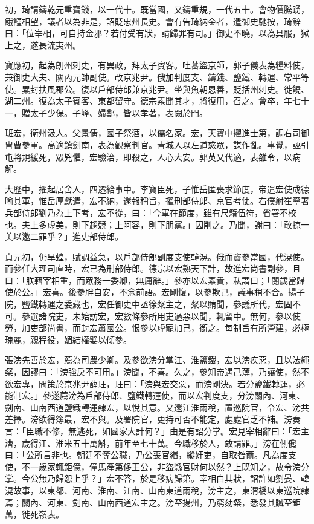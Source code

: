 \begin{pinyinscope}
 初，琦請鑄乾元重寶錢，以一代十。既當國，又鑄重規，一代五十。會物價騰踴，餓饉相望，議者以為非是，詔貶忠州長史。會有告琦納金者，遣御史馳按，琦辭曰：「位宰相，可自持金邪？若付受有狀，請歸罪有司。」御史不曉，以為具服，獄上之，遂長流夷州。



 寶應初，起為朗州刺史，有異政，拜太子賓客。吐蕃盜京師，郭子儀表為糧料使，兼御史大夫、關內元帥副使。改京兆尹。俄加判度支、鑄錢、鹽鐵、轉運、常平等使。累封扶風郡公。復以戶部侍郎兼京兆尹。坐與魚朝恩善，貶括州刺史。徙饒、湖二州。復為太子賓客、東都留守。德宗素聞其才，將復用，召之。會卒，年七十一，贈太子少保。子峰、婦鄭，皆以孝著，表闕於門。



 班宏，衛州汲人。父景倩，國子祭酒，以儒名家。宏，天寶中擢進士第，調右司御胄曹參軍。高適鎮劍南，表為觀察判官。青城人以左道惑眾，謀作亂。事覺，誣引屯將規緩死，眾兇懼，宏驗治，即殺之，人心大安。郭英乂代適，表雒令，以病解。



 大歷中，擢起居舍人，四遷給事中。李寶臣死，子惟岳匿喪求節度，帝遣宏使成德喻其軍，惟岳厚獻遣，宏不納，還報稱旨，擢刑部侍郎、京官考使。右僕射崔寧署兵部侍郎劉乃為上下考，宏不從，曰：「今軍在節度，雖有尺籍伍符，省署不校也。夫上多虛美，則下趨競；上阿容，則下朋黨。」因削之。乃聞，謝曰：「敢掠一美以邀二罪乎？」進吏部侍郎。



 貞元初，仍旱蝗，賦調益急，以戶部侍郎副度支使韓滉。俄而竇參當國，代滉使。而參任大理司直時，宏已為刑部侍郎。德宗以宏熟天下計，故進宏尚書副參，且曰：「朕藉宰相重，而眾務一委卿，無庸辭。」參亦以宏素貴，私謂曰；「閱歲當歸使於公。」宏喜。後參胖自安，不念前語。宏剛愎，以參欺己，議事稍不合。揚子院，鹽鐵轉運之委藏也，宏任御史中丞徐粲主之，粲以賄聞，參議所代，宏固不可。參選諸院吏，未始訪宏，宏數條參所用吏過惡以聞，輒留中。無何，參以使勞，加吏部尚書，而封宏蕭國公。恨參以虛寵加己，銜之。每制旨有所營建，必極瑰麗，親程役，媚結權嬖以傾參。



 張滂先善於宏，薦為司農少卿。及參欲滂分掌江、淮鹽鐵，宏以滂疾惡，且以法繩粲，因謬曰：「滂強戾不可用。」滂聞，不喜。久之，參知帝遇己薄，乃讓使，然不欲宏專，問策於京兆尹薛玨，玨曰：「滂與宏交惡，而滂剛決。若分鹽鐵轉運，必能制宏。」參遂薦滂為戶部侍郎、鹽鐵轉運使，而以宏判度支，分滂關內、河東、劍南、山南西道鹽鐵轉運隸宏，以悅其意。又還江淮兩稅，置巡院官，令宏、滂共差擇。滂欲得簿最，宏不與。及署院官，更持可否不能定，處處官乏不補。滂奏言：「臣職不修，無逃死，如國家大計何？」由是有詔分掌。宏見宰相辭曰：「宏主漕，歲得江、淮米五十萬斛，前年至七十萬。今職移於人，敢請罪。」滂在側儳曰：「公所言非也。朝廷不奪公職，乃公喪官緡，縱奸吏，自取咎爾。凡為度支使，不一歲家輒鉅億，僮馬產第侈王公，非盜縣官財何以然？上既知之，故令滂分掌。今公無乃歸怨上乎？」宏不答，於是移病歸第。宰相白其狀，詔許如劉晏、韓滉故事，以東都、河南、淮南、江南、山南東道兩稅，滂主之，東渭橋以東巡院隸焉；關內、河東、劍南、山南西道宏主之。滂至揚州，乃窮劾粲，悉發其贓至鉅萬，徙死嶺表。




\end{pinyinscope}
